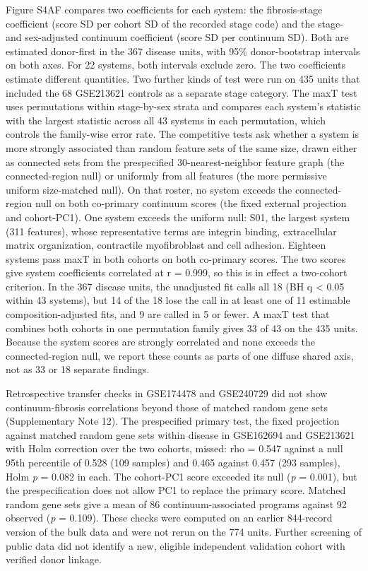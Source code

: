 Figure S4AF compares two coefficients for each system: the fibrosis-stage coefficient (score SD per cohort SD of the recorded stage code) and the stage- and sex-adjusted continuum coefficient (score SD per continuum SD). Both are estimated donor-first in the 367 disease units, with 95\% donor-bootstrap intervals on both axes. For 22 systems, both intervals exclude zero. The two coefficients estimate different quantities. Two further kinds of test were run on 435 units that included the 68 GSE213621 controls as a separate stage category. The maxT test uses permutations within stage-by-sex strata and compares each system's statistic with the largest statistic across all 43 systems in each permutation, which controls the family-wise error rate. The competitive tests ask whether a system is more strongly associated than random feature sets of the same size, drawn either as connected sets from the prespecified 30-nearest-neighbor feature graph (the connected-region null) or uniformly from all features (the more permissive uniform size-matched null). On that roster, no system exceeds the connected-region null on both co-primary continuum scores (the fixed external projection and cohort-PC1). One system exceeds the uniform null: S01, the largest system (311 features), whose representative terms are integrin binding, extracellular matrix organization, contractile myofibroblast and cell adhesion. Eighteen systems pass maxT in both cohorts on both co-primary scores. The two scores give system coefficients correlated at r = 0.999, so this is in effect a two-cohort criterion. In the 367 disease units, the unadjusted fit calls all 18 (BH q \textless{} 0.05 within 43 systems), but 14 of the 18 lose the call in at least one of 11 estimable composition-adjusted fits, and 9 are called in 5 or fewer. A maxT test that combines both cohorts in one permutation family gives 33 of 43 on the 435 units. Because the system scores are strongly correlated and none exceeds the connected-region null, we report these counts as parts of one diffuse shared axis, not as 33 or 18 separate findings.

Retrospective transfer checks in GSE174478 and GSE240729 did not show continuum-fibrosis correlations beyond those of matched random gene sets (Supplementary Note 12). The prespecified primary test, the fixed projection against matched random gene sets within disease in GSE162694 and GSE213621 with Holm correction over the two cohorts, missed: rho = 0.547 against a null 95th percentile of 0.528 (109 samples) and 0.465 against 0.457 (293 samples), Holm \emph{p} = 0.082 in each. The cohort-PC1 score exceeded its null (\emph{p} = 0.001), but the prespecification does not allow PC1 to replace the primary score. Matched random gene sets give a mean of 86 continuum-associated programs against 92 observed (\emph{p} = 0.109). These checks were computed on an earlier 844-record version of the bulk data and were not rerun on the 774 units. Further screening of public data did not identify a new, eligible independent validation cohort with verified donor linkage.

